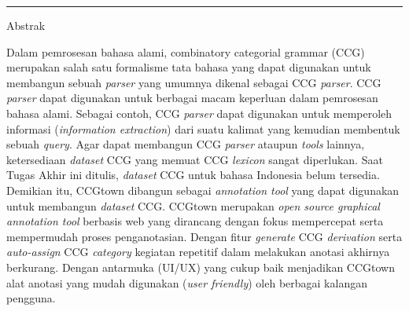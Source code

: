 {\bf \parindent0pt \noindent\rule{\textwidth}{1pt}
Abstrak

Dalam pemrosesan bahasa alami, combinatory categorial grammar (CCG) merupakan salah satu
formalisme tata bahasa yang dapat digunakan untuk membangun sebuah \textit{parser} yang umumnya
dikenal sebagai CCG \textit{parser}.
CCG \textit{parser} dapat digunakan untuk berbagai macam keperluan dalam pemrosesan bahasa alami.
Sebagai contoh, CCG \textit{parser} dapat digunakan untuk memperoleh informasi
(\textit{information extraction}) dari suatu kalimat yang kemudian membentuk sebuah \textit{query}.
Agar dapat membangun CCG \textit{parser} ataupun \textit{tools} lainnya, ketersediaan
\textit{dataset} CCG yang memuat CCG \textit{lexicon} sangat diperlukan. Saat Tugas Akhir ini
ditulis, \textit{dataset} CCG untuk bahasa Indonesia belum tersedia. Demikian itu, CCGtown dibangun
sebagai \textit{annotation tool} yang dapat digunakan untuk membangun \textit{dataset} CCG.
CCGtown merupakan \textit{open source graphical annotation tool} berbasis web yang dirancang
dengan fokus mempercepat serta mempermudah proses penganotasian.
Dengan fitur \textit{generate} CCG \textit{derivation} serta \textit{auto-assign} CCG
\textit{category} kegiatan repetitif dalam melakukan anotasi akhirnya berkurang.
Dengan antarmuka (UI/UX) yang cukup baik menjadikan CCGtown alat anotasi yang mudah digunakan
(\textit{user friendly}) oleh berbagai kalangan pengguna.



}
